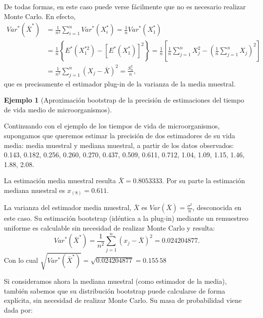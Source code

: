 \documentclass[
]{book}
\theoremstyle{break}
\theoremstyle{definition}
\theoremstyle{definition}
\newtheorem{example}{Ejemplo}[chapter]
\theoremstyle{definition}
\theoremstyle{definition}
\theoremstyle{remark}
\begin{document}
De todas formas, en este caso puede verse fácilmente que no es necesario
realizar Monte Carlo. En efecto,
\[\begin{aligned}
Var^{\ast}\left( \bar{X}^{\ast} \right) & = \frac{1}{n^2}
\sum_{i=1}^{n}Var^{\ast}\left( X_i^{\ast} \right) =\frac{1}{n}Var^{\ast}\left( X_1^{\ast} \right) \\
& = \frac{1}{n}\left\{ E^{\ast}\left( X_1^{\ast 2} \right) -
\left[ E^{\ast}\left( X_1^{\ast} \right) \right]^2\right\} =\frac{1}{n}\left[ 
\frac{1}{n}\sum_{j=1}^{n}X_j^2-\left( \frac{1}{n}\sum_{j=1}^{n}X_j \right)^2 \right] \\
& = \frac{1}{n^2}\sum_{j=1}^{n}\left( X_j-\bar{X} \right)^2=\frac{S_n^2}{n},
\end{aligned}\]
que es precisamente el estimador
plug-in de la varianza de la media muestral.

\begin{example}[Aproximación bootstrap de la precisión de estimaciones del tiempo de vida medio de microorganismos]
\protect\hypertarget{exm:estimacion-boot-precision}{}{\label{exm:estimacion-boot-precision} \iffalse (Aproximación bootstrap de la precisión de estimaciones del tiempo de vida medio de microorganismos) \fi{} } \vspace{0.5cm}

Continuando con el ejemplo de los tiempos de vida de microorganismos,
supongamos que queremos estimar
la precisión de dos estimadores de su vida media: media muestral y
mediana muestral, a partir de los datos observados: 0.143, 0.182, 0.256, 0.260, 0.270,
0.437, 0.509, 0.611, 0.712, 1.04, 1.09, 1.15, 1.46, 1.88, 2.08.
\end{example}

La estimación media muestral resulta \(\bar{X}=0.8053333\). Por su
parte la estimación mediana muestral es \(x_{\left( 8 \right)}=0.611\).

La varianza del estimador media muestral, \(\bar{X}\) es \(Var\left( \bar{X} \right) =\frac{\sigma^2}{n}\), desconocida en este caso.
Su estimación bootstrap (idéntica a la plug-in) mediante un remuestreo
uniforme es calculable sin necesidad de realizar Monte Carlo y
resulta:
\[Var^{\ast}\left( \bar{X}^{\ast} \right) =\frac{1}{n^2}
\sum_{j=1}^{n}\left( x_j-\bar{X} \right)^2=0.024204877.\]
Con lo cual \(\sqrt{Var^{\ast}\left( \bar{X}^{\ast} \right)}=\sqrt{ 0.024204877}= 0.155\,58\)

Si consideramos ahora la mediana muestral (como estimador de la media),
también sabemos que su distribución bootstrap puede calcularse de forma
explícita, sin necesidad de realizar Monte Carlo. Su masa de
probabilidad viene dada por:
\end{document}
